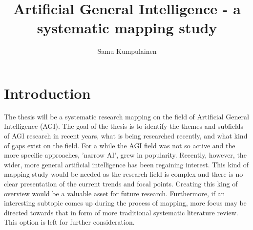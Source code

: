 \documentclass[utf8,english]{gradu3}
\begin{document}
\title{Artificial General Intelligence - a systematic mapping study}

\author{Samu Kumpulainen}

\maketitle

\mainmatter

\chapter{Introduction}
The thesis will be a systematic research mapping on the field of Artificial General Intelligence (AGI). The goal of the thesis is to identify the themes and subfields of AGI research in recent years, what is being researched recently, and what kind of gaps exist on the field. For a while the AGI field was not so active and the more specific approaches, 'narrow AI', grew in popularity. Recently, however, the wider, more general artificial intelligence has been regaining interest. This kind of mapping study would be needed as the research field is complex and there is no clear presentation of the current trends and focal points. Creating this king of overview would be a valuable asset for future research. Furthermore, if an interesting subtopic comes up during the process of mapping, more focus may be directed towards that in form of more traditional systematic literature review. This option is left for further consideration.
\end{document}
